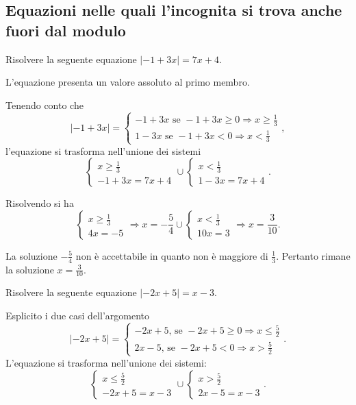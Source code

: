 \subsection{Equazioni nelle quali l'incognita si trova anche fuori dal modulo}
\begin{exrig}
\begin{esempio}
Risolvere la seguente equazione $\left|-1+3x\right|=7x+4$.

L'equazione presenta un valore assoluto al primo membro.

Tenendo conto che 
\[\left|-1+3x\right|=\left\{\begin{array}{l}{-1+3x\text{ se }-1+3x\ge 0\Rightarrow x\ge \frac 1 3}\\{1-3x\text{ se }-1+3x<0\Rightarrow x<\frac 1 3}\end{array}\right.,\]
l'equazione si trasforma nell'unione dei sistemi 
\[\left\{\begin{array}{l}{x\ge \frac 1 3}\\{-1+3x=7x+4}\end{array}\right.\cup \left\{\begin{array}{l}{x<\frac 1 3}\\{1-3x=7x+4}\end{array}\right..\]

Risolvendo si ha 
\[\left\{\begin{array}{l}{x\ge \frac 1 3}\\{4x=-5}\end{array}\right.\Rightarrow x=-\frac 5 4\cup \left\{\begin{array}{l}{x<\frac 1 3}\\{10x=3}\end{array}\right.\Rightarrow x=\frac 3{10}.\]

La soluzione $-\frac 5 4$ non è accettabile in quanto non è maggiore di $\frac 1 3$. Pertanto rimane la soluzione $x=\frac 3{10}$.
\end{esempio}

\begin{esempio}
Risolvere la seguente equazione $\left|-2x+5\right|=x-3$.

Esplicito i due casi dell’argomento 
\[\left|-2x+5\right|=\left\{\begin{array}{l}{-2x+5\text{, se }-2x+5\ge 0\Rightarrow x\le \frac 5 2}\\{2x-5\text{, se }-2x+5<0\Rightarrow x>\frac 5 2}\end{array}\right..\]
L'equazione si trasforma nell'unione dei sistemi: 
\[\left\{\begin{array}{l}{x\le \frac 5 2}\\{-2x+5=x-3}\end{array}\right.\cup \left\{\begin{array}{l}{x>\frac 5 2}\\{2x-5=x-3}\end{array}\right..\]


\end{esempio}
\end{exrig}
